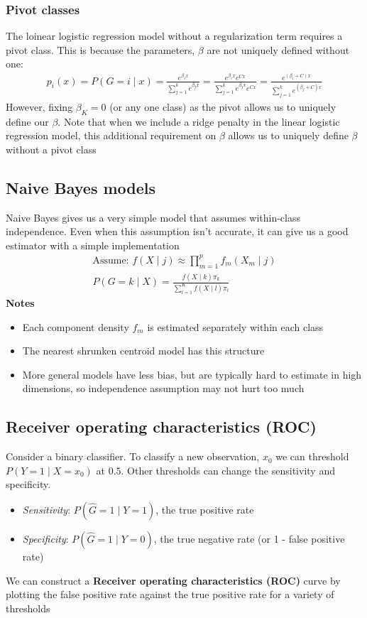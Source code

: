 \documentclass{article}
\begin{document}
\subsubsection{Pivot classes}
The loinear logistic regression model without a regularization term requires a pivot class. This is because the parameters, $\beta$ are not uniquely defined without one:
\begin{align*}
  p_i(x) = P(G=i \mid x) = \frac{e^{\beta_ix}}{\sum_{j=1}^ke^{\beta_jx}} = \frac{e^{\beta_ix}e^{Cx}}{\sum_{j=1}^ke^{\beta_jx}e^{Cx}} = \frac{e^{(\beta_i + C)x}}{\sum_{j=1}^ke^{(\beta_j + C)x}}
\end{align*}
However, fixing $\beta_K = 0$ (or any one class) as the pivot allows us to uniquely define our $\beta$. Note that when we include a ridge penalty in the linear logistic regression model, this additional requirement on $\beta$ allows us to uniquely define $\beta$ without a pivot class

\subsection{Naive Bayes models}
Naive Bayes gives us a very simple model that assumes within-class independence. Even when this assumption isn't accurate, it can give us a good estimator with a simple implementation
\begin{align*}
  \textrm{Assume: } f(X\mid j) \approx \prod_{m=1}^p f_m(X_m\mid j)\\
  P(G=k \mid X) = \frac{f(X\mid k)\pi_k}{\sum_{l=1}^Kf(X\mid l)\pi_l}
\end{align*}
\textbf{Notes}
\begin{itemize}
  \item Each component density $f_m$ is estimated separately within each class
  \item The nearest shrunken centroid model has this structure
  \item More general models have less bias, but are typically hard to estimate in high dimensions, so independence assumption may not hurt too much
\end{itemize}


\subsection{Receiver operating characteristics (ROC)}
Consider a binary classifier. To classify a new observation, $x_0$ we can threshold $P(Y=1\mid X=x_0)$ at $0.5$. Other thresholds can change the sensitivity and specificity.
\begin{itemize}
  \item \textit{Sensitivity}: $P(\hat{G}=1 \mid Y=1)$, the true positive rate
  \item \textit{Specificity}: $P(\hat{G}=1 \mid Y=0)$, the true negative rate (or 1 - false positive rate)
\end{itemize}
We can construct a \textbf{Receiver operating characteristics (ROC)} curve by plotting the false positive rate against the true positive rate for a variety of thresholds
\end{document}
